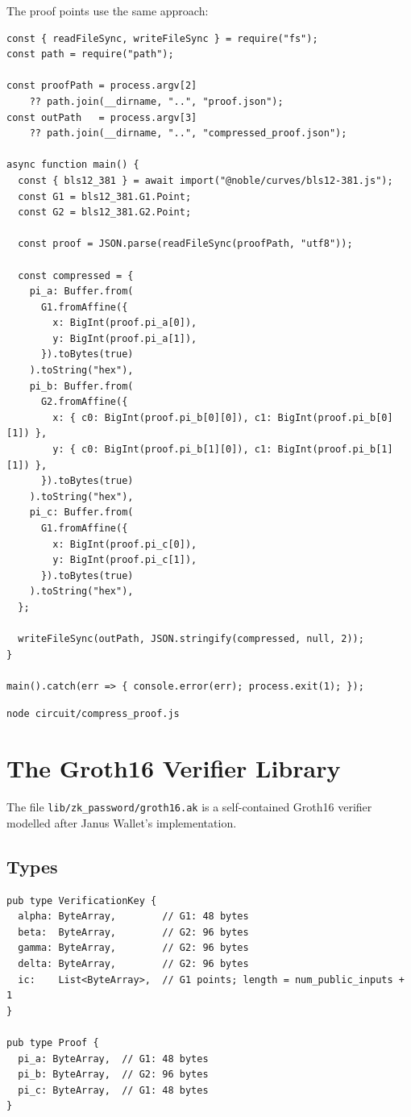The proof points use the same approach:

\begin{verbatim}
const { readFileSync, writeFileSync } = require("fs");
const path = require("path");

const proofPath = process.argv[2]
    ?? path.join(__dirname, "..", "proof.json");
const outPath   = process.argv[3]
    ?? path.join(__dirname, "..", "compressed_proof.json");

async function main() {
  const { bls12_381 } = await import("@noble/curves/bls12-381.js");
  const G1 = bls12_381.G1.Point;
  const G2 = bls12_381.G2.Point;

  const proof = JSON.parse(readFileSync(proofPath, "utf8"));

  const compressed = {
    pi_a: Buffer.from(
      G1.fromAffine({
        x: BigInt(proof.pi_a[0]),
        y: BigInt(proof.pi_a[1]),
      }).toBytes(true)
    ).toString("hex"),
    pi_b: Buffer.from(
      G2.fromAffine({
        x: { c0: BigInt(proof.pi_b[0][0]), c1: BigInt(proof.pi_b[0][1]) },
        y: { c0: BigInt(proof.pi_b[1][0]), c1: BigInt(proof.pi_b[1][1]) },
      }).toBytes(true)
    ).toString("hex"),
    pi_c: Buffer.from(
      G1.fromAffine({
        x: BigInt(proof.pi_c[0]),
        y: BigInt(proof.pi_c[1]),
      }).toBytes(true)
    ).toString("hex"),
  };

  writeFileSync(outPath, JSON.stringify(compressed, null, 2));
}

main().catch(err => { console.error(err); process.exit(1); });
\end{verbatim}

\begin{verbatim}
node circuit/compress_proof.js
\end{verbatim}

\section{The Groth16 Verifier Library} \label{sec:ch6-groth16}

The file \texttt{lib/zk\_password/groth16.ak} is a self-contained Groth16
verifier modelled after Janus Wallet's implementation.

\subsection*{Types}

\begin{verbatim}
pub type VerificationKey {
  alpha: ByteArray,        // G1: 48 bytes
  beta:  ByteArray,        // G2: 96 bytes
  gamma: ByteArray,        // G2: 96 bytes
  delta: ByteArray,        // G2: 96 bytes
  ic:    List<ByteArray>,  // G1 points; length = num_public_inputs + 1
}

pub type Proof {
  pi_a: ByteArray,  // G1: 48 bytes
  pi_b: ByteArray,  // G2: 96 bytes
  pi_c: ByteArray,  // G1: 48 bytes
}
\end{verbatim}

